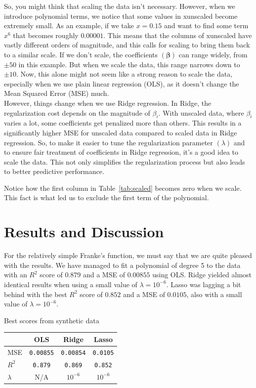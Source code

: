 \documentclass[twoside,11pt]{report}
\begin{document}
So, you might think that scaling the data isn't necessary.
However, when we introduce polynomial terms, we notice that some values in xunscaled become extremely small. As an example, 
if we take $x=0.15$ and want to find some term $x^6$ that becomes roughly $0.00001$. This means that the columns of xunscaled have vastly different orders of magnitude, and this calls 
for scaling to bring them back to a similar scale.
If we don't scale, the coefficients $(\boldsymbol{\beta})$ can range widely, from $\pm 50$ in this example. 
But when we scale the data, this range narrows 
down to $\pm 10$. Now, this alone might not seem like a strong reason to scale the data, especially when we use plain 
linear regression (OLS), as it doesn't change the Mean Squared Error (MSE) much.\\
However, things change when we use Ridge regression. In Ridge, the regularization cost depends on the magnitude of $\beta_i$.
With unscaled data, where $\beta_i$ varies a lot, some coefficients get penalized more than others. This results in a 
significantly higher MSE for unscaled data compared to scaled data in Ridge regression.
So, to make it easier to tune the regularization parameter $(\lambda)$ and to ensure fair treatment of coefficients in Ridge regression, 
it's a good idea to scale the data. This not only simplifies the regularization process but also leads to better predictive performance.

Notice how the first column in Table~\ref{tab:scaled} becomes zero when we scale. This fact is what led us to exclude the first term of the polynomial.










\section{Results and Discussion}
\label{sec:resultsdiscussion}


For the relatively simple Franke's function, we must say that we are quite pleased with the results.
We have managed to fit a polynomial of degree 5 to the data with an $R^2$ score of $0.879$ and a MSE of $0.00855$ 
using OLS. Ridge yielded almost identical results  when using a small value of $\lambda = 10^{-6}$.
Lasso was lagging a bit behind with the best $R^2$ score of $0.852$ and a MSE of $0.0105$, 
also with a small value of $\lambda = 10^{-6}$.
\begin{mytable}[float=!h,label=tab:toyscores, width=0.5\textwidth]{Best scores from synthetic data}
\centering
\begin{tabular}{l|c|c|c}
    & OLS & Ridge & Lasso \\
    \hline
    MSE  &   \texttt{0.00855} & \texttt{0.00854} & \texttt{0.0105} \\
    $R^2$     &   \texttt{0.879} & \texttt{0.869} & \texttt{0.852} \\
    $\lambda$ &  N/A  & $10^{-6}$ & $10^{-6}$ 
\end{tabular}%
\end{mytable}
\end{document}
